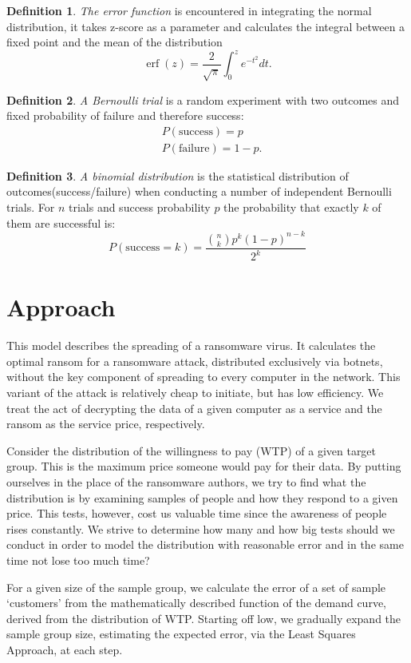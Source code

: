 \documentclass[11pt, a4paper]{article}
\theoremstyle{definition}
\newtheorem{definition}{Definition}
\begin{document}
		\begin{definition}
			\label{def:err}
			\emph{The error function} is encountered in integrating the normal distribution, it takes z-score as a parameter and calculates the integral between a fixed point and the mean of the distribution
			$$\operatorname{erf}(z)=\dfrac{2}{\sqrt{\pi}}\int_{0}^{z}e^{-t^{2}}dt.$$
		\end{definition}
		\begin{definition}
			\label{def:Bernoulli_trial}
			\emph{A Bernoulli trial} is a random experiment with two outcomes and fixed probability of failure and therefore success:
			\begin{align}
			&P(\text{success})=p\\
			&P(\text{failure})=1-p.
			\end{align}
		\end{definition}
	
		\begin{definition}
			\label{def:Binomial_distribution}
			\emph{A binomial distribution} is the statistical distribution of outcomes(success/failure) when conducting a number of independent Bernoulli trials.
			For $n$ trials and success probability $p$ the probability that exactly $k$ of them are successful is:
			$$
			P(\text{success} = k) = \frac{\binom{n}{k}p^{k}(1-p)^{n-k}}{2^k}
			$$
		\end{definition}
	
	\section{Approach}
		This model describes the spreading of a ransomware virus. It calculates the optimal ransom for a ransomware attack, distributed exclusively via botnets, without the key component of spreading to every computer in the network. This variant of the attack is relatively cheap to initiate, but has low efficiency.	We treat the act of decrypting the data of a given computer as a service and the ransom as the service price, respectively. \par
		Consider the distribution of the willingness to pay (WTP) of a given target group. This is the maximum price someone would pay for their data. By putting ourselves in the place of the ransomware authors, we try to find what the distribution is by examining samples of people and how they respond to a given price. This tests, however, cost us valuable time since the awareness of people rises constantly. We strive to determine how many and how big tests should we conduct in order to model the distribution with reasonable error and in the same time not lose too much time?\par
		For a given size of the sample group, we calculate the error of a set of sample `customers' from the mathematically described function of the demand curve, derived from the distribution of WTP. Starting off low, we gradually expand the sample group size, estimating the expected error, via the Least Squares Approach, at each step.
\end{document}
